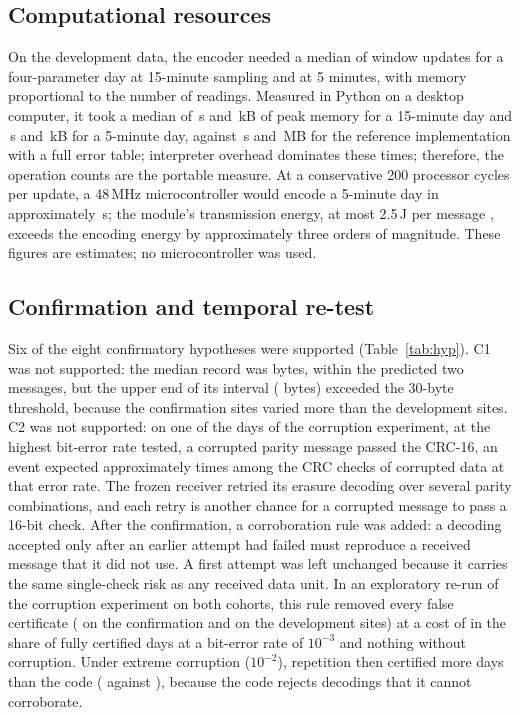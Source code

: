 \subsection{Computational resources}
\label{sec:resources}
On the development data, the encoder needed a median of \opsFifteenDev{} window updates for a four-parameter day at 15-minute sampling and \opsFiveDev{} at 5 minutes, with memory proportional to the number of readings. Measured in Python on a desktop computer, it took a median of \hostFifteenS{}\,s and \hostFifteenKB{}\,kB of peak memory for a 15-minute day and \hostFiveS{}\,s and \hostFiveKB{}\,kB for a 5-minute day, against \hostTableFiveS{}\,s and \hostTableFiveMB{}\,MB for the reference implementation with a full error table; interpreter overhead dominates these times; therefore, the operation counts are the portable measure. At a conservative 200 processor cycles per update, a 48\,MHz microcontroller would encode a 5-minute day in approximately \mcuFiveDev{}\,s; the module's transmission energy, at most 2.5\,J per message \citep{kineis2023kim1}, exceeds the encoding energy by approximately three orders of magnitude. These figures are estimates; no microcontroller was used.

\subsection{Confirmation and temporal re-test}
\label{sec:confirm}
Six of the eight confirmatory hypotheses were supported (Table~\ref{tab:hyp}). C1 was not supported: the median record was \needMedConf{} bytes, within the predicted two messages, but the upper end of its interval (\needMedConfHi{} bytes) exceeded the 30-byte threshold, because the confirmation sites varied more than the development sites. C2 was not supported: on one of the \nDaysCorrConf{} days of the corruption experiment, at the highest bit-error rate tested, a corrupted parity message passed the CRC-16, an event expected approximately \collisionsExpConf{} times among the \crcChecksConf{} CRC checks of corrupted data at that error rate. The frozen receiver retried its erasure decoding over several parity combinations, and each retry is another chance for a corrupted message to pass a 16-bit check. After the confirmation, a corroboration rule was added: a decoding accepted only after an earlier attempt had failed must reproduce a received message that it did not use. A first attempt was left unchanged because it carries the same single-check risk as any received data unit. In an exploratory re-run of the corruption experiment on both cohorts, this rule removed every false certificate (\falseCertPostConf{} on the confirmation and \falseCertPostDev{} on the development sites) at a cost of \postCostThreeConf{} in the share of fully certified days at a bit-error rate of $10^{-3}$ and nothing without corruption. Under extreme corruption ($10^{-2}$), repetition then certified more days than the code (\postRepTwoConf{} against \postCodeTwoConf{}), because the code rejects decodings that it cannot corroborate.

